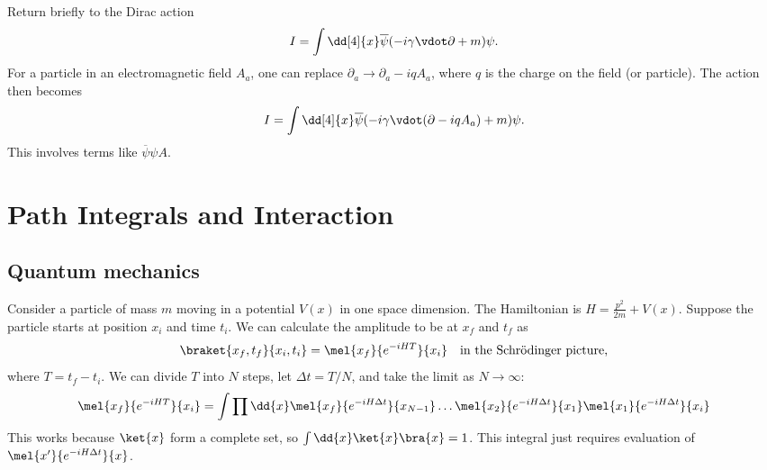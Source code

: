 \documentclass{jknotes} %
\begin{document}
Return briefly to the Dirac action
\begin{equation}
    I = \int\dd[4]{x}\overline{\psi}(-i\gamma\vdot\partial + m)\psi.
\end{equation}
For a particle in an electromagnetic field \(A_a\), one can replace \(\partial_a \to \partial_a - iqA_a\), where \(q\) is the charge on the field (or particle). The action then becomes
\begin{equation}
    I = \int\dd[4]{x}\overline{\psi}(-i\gamma\vdot(\partial - iqA_a) + m)\psi.
\end{equation}
This involves terms like \(\overline{\psi}\psi A\).

\section{Path Integrals and Interaction}
\subsection{Quantum mechanics}
Consider a particle of mass \(m\) moving in a potential \(V(x)\) in one space dimension. The Hamiltonian is \(H=\frac{p^2}{2m} + V(x)\). Suppose the particle starts at position \(x_i\) and time \(t_i\). We can calculate the amplitude to be at \(x_f\) and \(t_f\) as
\begin{equation}
    \braket{x_f,t_f}{x_i,t_i} = \mel{x_f}{e^{-iHT}}{x_i} \quad \text{in the Schr\"odinger picture,}
\end{equation}
where \(T=t_f-t_i\). We can divide \(T\) into \(N\) steps, let \(\Delta t=T/N\), and take the limit as \(N\to\infty\):
\begin{equation}
    \mel{x_f}{e^{-iHT}}{x_i} = \int \prod\dd{x}\mel{x_f}{e^{-iH\Delta t}}{x_{N-1}} \dots \mel{x_2}{e^{-iH\Delta t}}{x_1} \mel{x_1}{e^{-iH\Delta t}}{x_i}
\end{equation}
This works because \(\ket{x}\) form a complete set, so \(\int\dd{x}\ket{x}\bra{x}=1\). This integral just requires evaluation of \(\mel{x'}{e^{-iH\Delta t}}{x}\).
\end{document}
